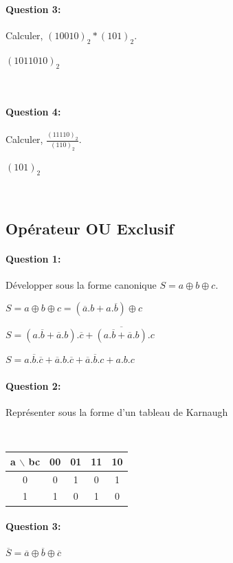 ~\

\paragraph{Question 3:}

Calculer, $(10010)_{2}*(101)_{2}$.

$(1011010)_{2}$

~\

\paragraph{Question 4:}

Calculer, $\frac{(11110)_{2}}{(110)_{2}}$.

$(101)_{2}$

~\

\subsection{Opérateur OU Exclusif}

\paragraph{Question 1:}

Développer sous la forme canonique $S= a \oplus b \oplus c$.

$S= a \oplus b \oplus c=(\overline{a}.b+a.\overline{b}) \oplus c$

$S=(a.\overline{b}+\overline{a}.b).\overline{c}+\overline{(a.\overline{b}+\overline{a}.b)}.c$

$S=a.\overline{b}.\overline{c}+\overline{a}.b.\overline{c}+\overline{a}.\overline{b}.c+a.b.c$



\paragraph{Question 2:}

Représenter sous la forme d'un tableau de Karnaugh

~\

\begin{center}
\begin{tabular}{|c|c|c|c|c|}
\hline
a $\backslash$ bc & 00 & 01 & 11 & 10 \\
\hline
0  & 0 & 1 & 0 & 1 \\
\hline
1  & 1 & 0 & 1 & 0 \\
\hline
\end{tabular} 
\end{center}

\paragraph{Question 3:}

$\overline{S}= \overline{a} \oplus \overline{b} \oplus \overline{c}$


